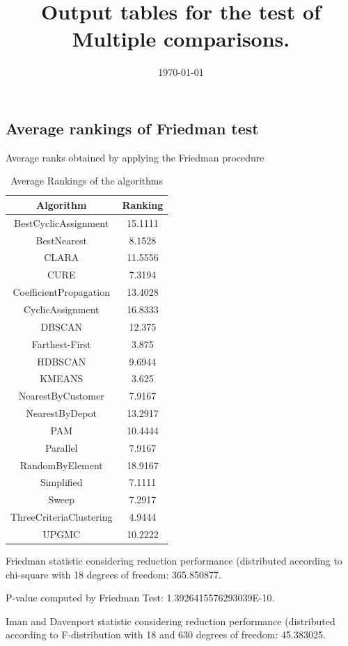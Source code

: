 \documentclass[a4paper,10pt]{article}
\title{Output tables for the test of Multiple comparisons.}
\author{}
\date{\today}
\begin{document}
\begin{landscape}
\pagestyle{empty}
\maketitle
\thispagestyle{empty}
\section{Average rankings of Friedman test}



Average ranks obtained by applying the Friedman procedure

\begin{table}[!htp]
\centering
\begin{tabular}{|c|c|}\hline
Algorithm&Ranking\\\hline
BestCyclicAssignment & 15.1111\\
BestNearest & 8.1528\\
CLARA & 11.5556\\
CURE & 7.3194\\
CoefficientPropagation & 13.4028\\
CyclicAssignment & 16.8333\\
DBSCAN & 12.375\\
Farthest-First & 3.875\\
HDBSCAN & 9.6944\\
KMEANS & 3.625\\
NearestByCustomer & 7.9167\\
NearestByDepot & 13.2917\\
PAM & 10.4444\\
Parallel & 7.9167\\
RandomByElement & 18.9167\\
Simplified & 7.1111\\
Sweep & 7.2917\\
ThreeCriteriaClustering & 4.9444\\
UPGMC & 10.2222\\
\hline
\end{tabular}
\caption{Average Rankings of the algorithms}
\end{table}

Friedman statistic considering reduction performance (distributed according to chi-square with 18 degrees of freedom: 365.850877.

P-value computed by Friedman Test: 1.3926415576293039E-10.\newline

Iman and Davenport statistic considering reduction performance (distributed according to F-distribution with 18 and 630 degrees of freedom: 45.383025.


\end{landscape}
\end{document}

